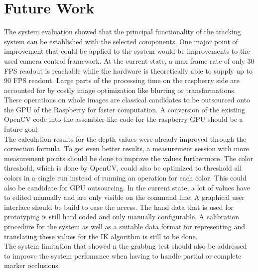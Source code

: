 \chapter{Future Work}
The system evaluation showed that the principal functionality of the tracking system can be established with the selected components. One major point of improvement that could be applied to the system would be improvements to the used camera control framework. At the current state, a max frame rate of only 30 FPS readout is reachable while the hardware is theoretically able to supply up to 90 FPS readout. 
Large parts of the processing time on the raspberry side are accounted for by costly image optimization like blurring or transformations. These operations on whole images are classical candidates to be outsourced onto the GPU of the Raspberry for faster computation. A conversion of the existing OpenCV code into the assembler-like code for the raspberry GPU should be a future goal.\\
The calculation results for the depth values were already improved through the correction formula. To get even better results, a measurement session with more measurement points should be done to improve the values furthermore.
The color threshold, which is done by OpenCV, could also be optimized to threshold all colors in a single run instead of running an operation for each color. This could also be candidate for GPU outsourcing.
In the current state, a lot of values have to edited manually and are only visible on the command line. A graphical user interface should be build to ease the access.
The hand data that is used for prototyping is still hard coded and only manually configurable. A calibration procedure for the system as well as a suitable data format for representing and translating these values for the IK algorithm is still to be done. 
\\The system limitation that showed n the grabbng test should also be addressed to improve the system perfomance when having to handle partial or complete marker occlusions.

